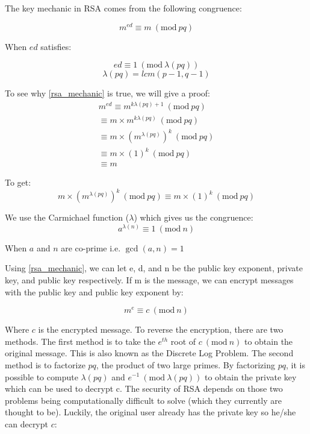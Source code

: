 \documentclass[acmlarge]{acmart}
\newcommand{\Mod}[1]{\ (\mathrm{mod}\ #1)}
\begin{document}
The key mechanic in RSA comes from the following congruence:

\begin{equation}
\label{rsa_mechanic}
	m^{ed} \equiv m \Mod{pq}
\end{equation}

When $ed$ satisfies:

\begin{equation}
\label{ed_equiv}
	ed \equiv 1 \Mod{\lambda(pq)}
\end{equation}
\begin{equation}
\label{carmichael}
	\lambda(pq) = lcm(p - 1, q - 1)
\end{equation}

To see why \ref{rsa_mechanic} is true, we will give a proof:
\begin{equation}
\label{rsa_proof}
\begin{split}
	m^{ed} 
	\equiv m^{k\lambda(pq) + 1} \Mod{pq} \\
	\equiv m \times m^{k\lambda(pq)} \Mod{pq} \\
	\equiv m \times (m^{\lambda(pq)})^{k} \Mod{pq} \\
	\equiv m \times (1)^{k} \Mod{pq} \\
	\equiv m
\end{split}
\end{equation}

To get:
\begin{equation}
	m \times (m^{\lambda(pq)})^{k} \Mod{pq} \equiv m \times (1)^{k} \Mod{pq}
\end{equation}

We use the Carmichael function ($\lambda$) which gives us the congruence:
\begin{equation}
\label{carmichael_fun}
	a^{\lambda(n)} \equiv 1 \Mod{n}
\end{equation}

When $a$ and $n$ are co-prime i.e. $\gcd(a, n) = 1$

Using \ref{rsa_mechanic}, we can let e, d, and n be the public key exponent, private key, and public key respectively. If m is the message, we can encrypt messages with the public key and public key exponent by:

\begin{equation}
	m^{e} \equiv c \Mod{n}
\end{equation}

Where $c$ is the encrypted message. To reverse the encryption, there are two methods. The first method is to take the $e^{th}$ root of $c \Mod{n}$ to obtain the original message. This is also known as the Discrete Log Problem. The second method is to factorize $pq$, the product of two large primes. By factorizing $pq$, it is possible to compute $\lambda(pq)$ and $e^{-1} \Mod{\lambda(pq)}$ to obtain the private key which can be used to decrypt c. The security of RSA depends on those two problems being computationally difficult to solve (which they currently are thought to be). Luckily, the original user already has the private key so he/she can decrypt $c$:
\end{document}
